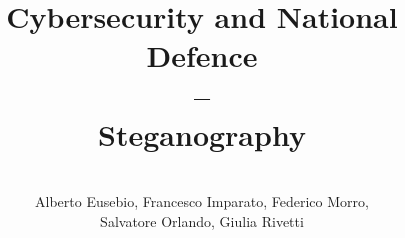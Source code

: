 \documentclass{article}
\title{
    Cybersecurity and National Defence\\--\\
    \Large Steganography}
\author{\\Alberto Eusebio, Francesco Imparato, Federico Morro,\\Salvatore
Orlando, Giulia Rivetti}
\date{}
\begin{document}
    \maketitle
    \tableofcontents

    \pagebreak
    
\end{document}
